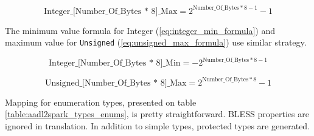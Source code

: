 \begin{equation} \label{eq:integer_max_formula}
	\text{Integer\_[Number\_Of\_Bytes * 8]\_Max} = 2^{\text{Number\_Of\_Bytes} * 8 - 1} - 1
\end{equation}

The minimum value formula for Integer (\ref{eq:integer_min_formula}) and maximum value for \lstinline{Unsigned} (\ref{eq:unsigned_max_formula}) use similar strategy.

\begin{equation} \label{eq:integer_min_formula}
	\text{Integer\_[Number\_Of\_Bytes * 8]\_Min} = -2^{\text{Number\_Of\_Bytes} * 8 - 1}
\end{equation}

\begin{equation} \label{eq:unsigned_max_formula}
	\text{Unsigned\_[Number\_Of\_Bytes * 8]\_Max} = 2^{\text{Number\_Of\_Bytes} * 8} - 1
\end{equation}

Mapping for enumeration types, presented on table \ref{table:aadl2spark_types_enums}, is pretty straightforward. BLESS properties are ignored in translation. In addition to simple types, protected types are generated.

